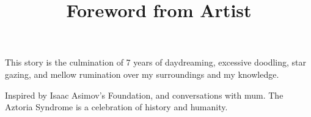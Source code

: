 \documentclass[11pt]{article}
\begin{document}
\ttfamily
\title{Foreword from Artist}
\maketitle
This story is the culmination of 7 years of daydreaming, excessive doodling, star gazing, and mellow rumination over my surroundings and my knowledge.

Inspired by Isaac Asimov's Foundation, and conversations with mum.
The Aztoria Syndrome is a celebration of history and humanity.
\end{document}
